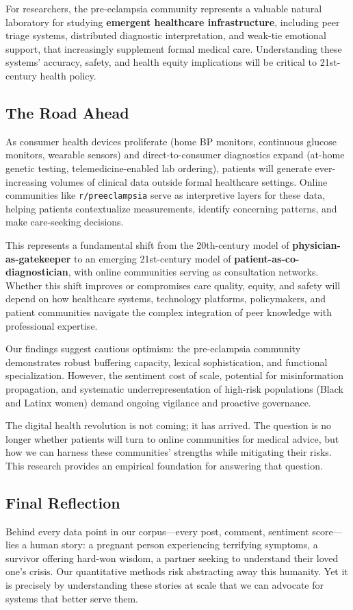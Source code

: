 \documentclass[12pt, a4paper]{article}
\begin{document}
For researchers, the pre-eclampsia community represents a valuable natural laboratory for studying \textbf{emergent healthcare infrastructure}, including peer triage systems, distributed diagnostic interpretation, and weak-tie emotional support, that increasingly supplement formal medical care. Understanding these systems' accuracy, safety, and health equity implications will be critical to 21st-century health policy.

\subsection{The Road Ahead}
As consumer health devices proliferate (home BP monitors, continuous glucose monitors, wearable sensors) and direct-to-consumer diagnostics expand (at-home genetic testing, telemedicine-enabled lab ordering), patients will generate ever-increasing volumes of clinical data outside formal healthcare settings. Online communities like \texttt{r/preeclampsia} serve as interpretive layers for these data, helping patients contextualize measurements, identify concerning patterns, and make care-seeking decisions.

This represents a fundamental shift from the 20th-century model of \textbf{physician-as-gatekeeper} to an emerging 21st-century model of \textbf{patient-as-co-diagnostician}, with online communities serving as consultation networks. Whether this shift improves or compromises care quality, equity, and safety will depend on how healthcare systems, technology platforms, policymakers, and patient communities navigate the complex integration of peer knowledge with professional expertise.

Our findings suggest cautious optimism: the pre-eclampsia community demonstrates robust buffering capacity, lexical sophistication, and functional specialization. However, the sentiment cost of scale, potential for misinformation propagation, and systematic underrepresentation of high-risk populations (Black and Latinx women) demand ongoing vigilance and proactive governance.

The digital health revolution is not coming; it has arrived. The question is no longer whether patients will turn to online communities for medical advice, but how we can harness these communities' strengths while mitigating their risks. This research provides an empirical foundation for answering that question.

\subsection{Final Reflection}
Behind every data point in our corpus—every post, comment, sentiment score—lies a human story: a pregnant person experiencing terrifying symptoms, a survivor offering hard-won wisdom, a partner seeking to understand their loved one's crisis. Our quantitative methods risk abstracting away this humanity. Yet it is precisely by understanding these stories at scale that we can advocate for systems that better serve them.
\end{document}
